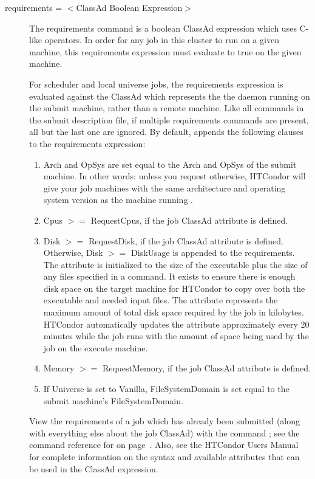 \begin{description}

\label{man-condor-submit-requirements}
\item[requirements = $<$ClassAd Boolean Expression$>$]
The requirements
command is a boolean ClassAd expression which uses C-like operators. In
order for any job in this cluster to run on a given machine, this
requirements expression must evaluate to true on the given machine. 


For scheduler and local universe jobs, the requirements expression is
evaluated against
the  ClassAd which represents the 
the  daemon running on the submit machine,
rather than a remote machine.
Like all commands in the submit description file, if multiple requirements
commands are present, all but the last one are ignored.
By default,  appends the following clauses to
the requirements expression:
\begin{enumerate}
        \item Arch and OpSys are set equal to the Arch and OpSys of the
submit machine.  In other words: unless you request otherwise, 
HTCondor will give your
job machines with the same architecture and operating system version as
the machine running .
        \item Cpus $>=$ RequestCpus, if the job ClassAd attribute
 is defined.
        \item Disk $>=$ RequestDisk, if the job ClassAd attribute
 is defined.
Otherwise, Disk $>=$ DiskUsage is appended to the requirements.
The  attribute is initialized to the size of the
executable plus the size of any files specified in a
 command.
It exists to ensure there is enough disk space on the
target machine for HTCondor to copy over both the executable
and needed input files.
The  attribute represents the maximum amount of
total disk space required by the job in kilobytes.
HTCondor automatically updates the  attribute
approximately every 20 minutes while the job runs with the
amount of space being used by the job on the execute machine.
        \item Memory $>=$ RequestMemory, if the job ClassAd attribute
 is defined.
        \item If Universe is set to Vanilla, FileSystemDomain is set equal to
the submit machine's FileSystemDomain.
\end{enumerate}
View the requirements of a job
which has already been submitted (along with everything else about the
job ClassAd) with the command ; see the command reference for
 on page~\pageref{man-condor-q}.  Also, see the HTCondor Users
Manual for complete information on the syntax and available attributes
that can be used in the ClassAd expression.



\end{description}
